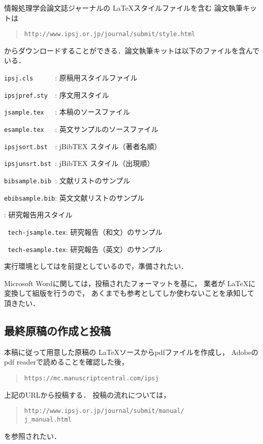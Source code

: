 \documentclass[submit, uplatex]{ipsj}
\def\|{\verb|}
\begin{document}
情報処理学会論文誌ジャーナルの \LaTeX スタイルファイルを含む
論文執筆キットは
\begin{quote}
\small
\|http://www.ipsj.or.jp/journal/submit/style.html|
\end{quote}
からダウンロードすることができる．論文執筆キットは以下のファイルを含んでいる．


\begin{Enumerate}
\item \|ipsj.cls      |: 原稿用スタイルファイル
\item \|ipsjpref.sty  |: 序文用スタイル
\item \|jsample.tex   |: 本稿のソースファイル
\item \|esample.tex   |: 英文サンプルのソースファイル
\item \|ipsjsort.bst  |: jBibTEX スタイル（著者名順）
\item \|ipsjunsrt.bst |: jBibTEX スタイル（出現順）
\item \|bibsample.bib |: 文献リストのサンプル
\item \|ebibsample.bib|: 英文文献リストのサンプル
\item {}: 研究報告用スタイル
\item \| tech-jsample.tex|: 研究報告（和文）のサンプル
\item \| tech-esample.tex|: 研究報告（英文）のサンプル
\end{Enumerate}%
実行環境としては\LaTeXe を前提としているので，準備されたい．


Microsoft Wordに関しては，投稿されたフォーマットを基に，
業者が \LaTeX に変換して組版を行うので，
あくまでも参考としてしか使わないことを承知して頂きたい．



\subsection{最終原稿の作成と投稿}

本稿に従って用意した原稿の \LaTeX ソースからpdfファイルを作成し，
Adobeのpdf readerで読めることを確認した後，
\begin{quote}
\small
\|https://mc.manuscriptcentral.com/ipsj|
\end{quote}
上記のURLから投稿する．
投稿の流れについては，
\begin{quote}
\small
\|http://www.ipsj.or.jp/journal/submit/manual/|\\
\|j_manual.html|
\end{quote}
を参照されたい．
\end{document}
